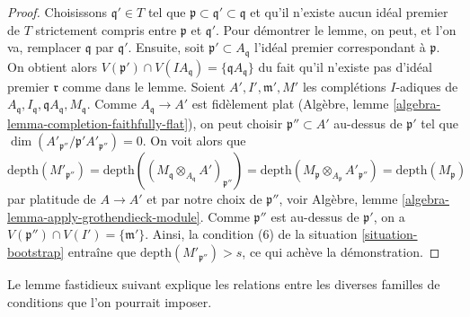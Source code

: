 \begin{proof}
Choisissons $\mathfrak q' \in T$ tel que
$\mathfrak p \subset \mathfrak q' \subset \mathfrak q$
et qu'il n'existe aucun idéal premier de $T$ strictement
compris entre $\mathfrak p$ et $\mathfrak q'$. Pour démontrer le lemme,
on peut, et l'on va, remplacer $\mathfrak q$ par $\mathfrak q'$.
Ensuite, soit $\mathfrak p' \subset A_\mathfrak q$ l'idéal premier correspondant à
$\mathfrak p$. On obtient alors
$V(\mathfrak p') \cap V(IA_\mathfrak q) = \{\mathfrak q A_\mathfrak q\}$
du fait qu'il n'existe pas d'idéal premier $\mathfrak r$ comme dans le lemme.
Soient $A', I', \mathfrak m', M'$ les complétions $I$-adiques de
$A_\mathfrak q, I_\mathfrak q, \mathfrak qA_\mathfrak q, M_\mathfrak q$.
Comme $A_\mathfrak q \to A'$ est fidèlement plat
(Algèbre, lemme \ref{algebra-lemma-completion-faithfully-flat}),
on peut choisir $\mathfrak p'' \subset A'$ au-dessus de $\mathfrak p'$
tel que $\dim(A'_{\mathfrak p''}/\mathfrak p' A'_{\mathfrak p''}) = 0$.
On voit alors que
$$
\text{depth}(M'_{\mathfrak p''}) =
\text{depth}((M_\mathfrak q \otimes_{A_\mathfrak q} A')_{\mathfrak p''}) =
\text{depth}(M_\mathfrak p \otimes_{A_\mathfrak p} A'_{\mathfrak p''}) =
\text{depth}(M_\mathfrak p)
$$
par platitude de $A \to A'$ et par notre choix de $\mathfrak p''$, voir
Algèbre, lemme \ref{algebra-lemma-apply-grothendieck-module}.
Comme $\mathfrak p''$ est au-dessus de $\mathfrak p'$, on a
$V(\mathfrak p'') \cap V(I') = \{\mathfrak m'\}$. Ainsi, la
condition (6) de la situation \ref{situation-bootstrap} entraîne que
$\text{depth}(M'_{\mathfrak p''}) > s$, ce qui achève la démonstration.
\end{proof}

\noindent
Le lemme fastidieux suivant explique les relations entre les diverses
familles de conditions que l'on pourrait imposer.

